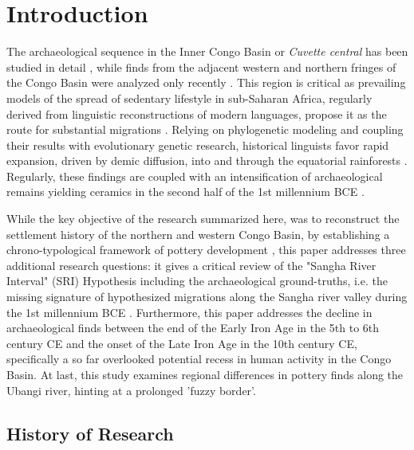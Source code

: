 \documentclass[smallextended,natbib]{svjour3}       %
\begin{document}
\begin{abstract}
\end{abstract}

\section*{Introduction}\label{intro}

The archaeological sequence in the Inner Congo Basin or \textit{Cuvette central} has been studied in detail \citep{Wotzka.1995}, while finds from the adjacent western and northern fringes of the Congo Basin were analyzed only recently \citep{Seidensticker.2021e}. This region is critical as prevailing models of the spread of sedentary lifestyle in sub-Saharan Africa, regularly derived from linguistic reconstructions of modern languages, propose it as the route for substantial migrations \citep{Bostoen.2018,Bostoen.2020}. Relying on phylogenetic modeling and coupling their results with evolutionary genetic research, historical linguists favor rapid expansion, driven by demic diffusion, into and through the equatorial rainforests \citep{Currie.2013,Bostoen.2015,Grollemund.2015,Koile.2022,Grollemund.2023}. Regularly, these findings are coupled with an intensification of archaeological remains yielding ceramics in the second half of the 1st millennium BCE \citep{deSaulieu.2021a,Seidensticker.2021}.

While the key objective of the research summarized here, was to reconstruct the settlement history of the northern and western Congo Basin, by establishing a chrono-typological framework of pottery development \citep{Seidensticker.2021e}, this paper addresses three additional research questions: it gives a critical review of the "Sangha River Interval" (SRI) Hypothesis including the archaeological ground-truths, i.e. the missing signature of hypothesized migrations along the Sangha river valley during the 1st millennium BCE \citep{Currie.2013,Bostoen.2015,Grollemund.2015,Koile.2022,Grollemund.2023}. Furthermore, this paper addresses the decline in archaeological finds between the end of the Early Iron Age in the 5th to 6th century CE and the onset of the Late Iron Age in the 10th century CE, specifically a so far overlooked potential recess in human activity in the Congo Basin. At last, this study examines regional differences in pottery finds along the Ubangi river, hinting at a prolonged 'fuzzy border'.

\subsection*{History of Research}
\end{document}
